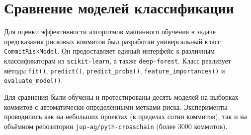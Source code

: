 \section{Сравнение моделей классификации}

Для оценки эффективности алгоритмов машинного обучения в задаче предсказания рисковых коммитов был разработан универсальный класс \texttt{CommitRiskModel}. Он предоставляет единый интерфейс к различным классификаторам из \texttt{scikit-learn}, а также \texttt{deep-forest}. Класс реализует методы \texttt{fit()}, \texttt{predict()}, \texttt{predict\_proba()}, \texttt{feature\_importances()} и \texttt{evaluate\_model()}.

Для сравнения были обучены и протестированы десять моделей на выборках коммитов с автоматически определёнными метками риска. Эксперименты проводились как на небольших проектах (в пределах сотни коммитов), так и на объёмном репозитории \texttt{jup-ag/pyth-crosschain} (более 3000 коммитов).

\begin{table}[h!]
	\centering
	\caption{Сравнение моделей классификации на малом проекте (Pacan4ik/tinkoff-course-spring2023)}
	\label{tab:metrics_comparison_small_extended}
\end{table}

